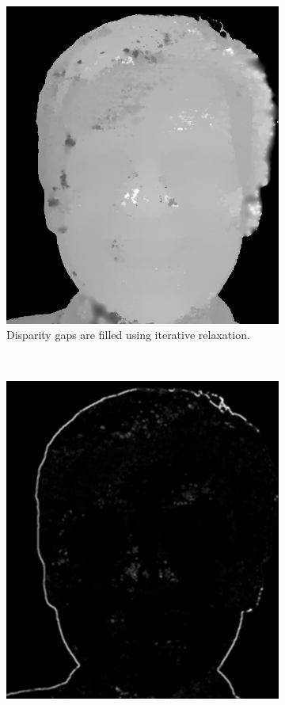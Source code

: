 \documentclass[journal]{IEEEtran}
\begin{document}
\begin{figure}[h]
    ~
    \begin{subfigure}[t]{0.45\linewidth}
        \centering
        \includegraphics[width=\linewidth]{Pics/disparity-fill.png}
        \caption{Disparity gaps are filled using iterative relaxation.}
        \label{fig:disparity-filled}
    \end{subfigure}
    ~
    \begin{subfigure}[t]{0.45\linewidth}
        \centering
        \includegraphics[width=\linewidth]{Pics/disparity-lapf.png}

\end{subfigure}
\end{figure}
\end{document}
